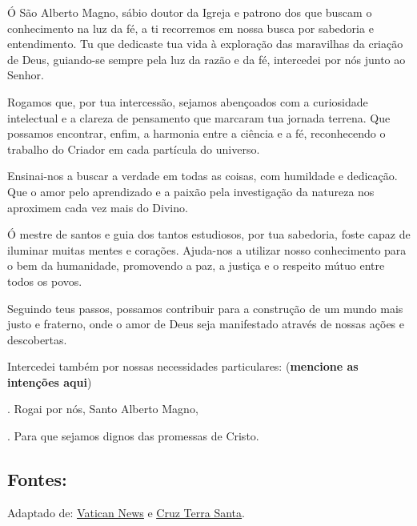 \documentclass[a4paper,14pt,twoside]{extarticle} \usepackage[utf8]{inputenc}
\makeatletter
\newcommand{\vers@resp@sym}{%
  \raisebox{0.2ex}{\rotatebox[origin=c]{-20}{$\m@th\rceil$}}%
}
\newcommand{\vers@resp}[2]{%
  {\ooalign{%
     \hidewidth\kern#1\vers@resp@sym\hidewidth\cr
     #2\cr
  }}%
}
\DeclareRobustCommand{\versicle}{\vers@resp{-0.1em}{\textbf{V}}}
\DeclareRobustCommand{\response}{\vers@resp{0pt}{\textbf{R}}}
\makeatother
\begin{document}
Ó São Alberto Magno, sábio doutor da Igreja e patrono dos que buscam o conhecimento na luz da fé, a ti recorremos em nossa busca por sabedoria e entendimento. Tu que dedicaste tua vida à exploração das maravilhas da criação de Deus, guiando-se sempre pela luz da razão e da fé, intercedei por nós junto ao Senhor.

Rogamos que, por tua intercessão, sejamos abençoados com a curiosidade intelectual e a clareza de pensamento que marcaram tua jornada terrena. Que possamos encontrar, enfim, a harmonia entre a ciência e a fé, reconhecendo o trabalho do Criador em cada partícula do universo.

Ensinai-nos a buscar a verdade em todas as coisas, com humildade e dedicação. Que o amor pelo aprendizado e a paixão pela investigação da natureza nos aproximem cada vez mais do Divino.

Ó mestre de santos e guia dos tantos estudiosos, por tua sabedoria, foste capaz de iluminar muitas mentes e corações. Ajuda-nos a utilizar nosso conhecimento para o bem da humanidade, promovendo a paz, a justiça e o respeito mútuo entre todos os povos.

Seguindo teus passos, possamos contribuir para a construção de um mundo mais justo e fraterno, onde o amor de Deus seja manifestado através de nossas ações e descobertas.

Intercedei também por nossas necessidades particulares: (\textbf{mencione as intenções aqui})

\versicle. Rogai por nós, Santo Alberto Magno,

\response. Para que sejamos dignos das promessas de Cristo.

\vfill

\begin{center}
\subsection*{Fontes:}
Adaptado de: 
 \underline{\href{https://www.vaticannews.va/pt/santo-do-dia/11/15/s--alberto-magno--bispo-e-doutor-da-igreja--dominicano.html}{Vatican News}} e  \underline{\href{https://cruzterrasanta.com.br/santo-alberto-magno/181/105/}{Cruz Terra Santa}}.
\end{center}
\end{document}
